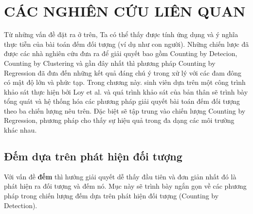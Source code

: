 \chapter{CÁC NGHIÊN CỨU LIÊN QUAN}
\ifpdf
    \graphicspath{{Chapter2/Chapter2Figs/PNG/}{Chapter2/Chapter2Figs/PDF/}{Chapter2/Chapter2Figs/}}
\else
    \graphicspath{{Chapter2/Chapter2Figs/EPS/}{Chapter2/Chapter2Figs/}}
\fi


Từ những vấn đề đặt ra ở trên, Ta có thể thấy được tính ứng dụng và ý nghĩa thực tiễn của bài toán đếm đối tượng (ví dụ như con người). Những chiến lược đã được các nhà nghiên cứu đưa ra để giải quyết bao gồm Counting by Detecion, Counting by Clustering và gần đây nhất thì phương pháp Counting by Regression đã đưa đến những kết quả đáng chú ý trong xử lý với các đam đông có mật độ lớn và phức tạp. Trong chương này. sinh viên dựa trên một công trình khảo sát thực hiện bởi Loy et al. \cite{loy2013crowd} và quá trình khảo sát của bản thân sẽ trình bày tổng quát và hệ thống hóa các phương pháp giải quyết bài toán đếm đối tượng theo ba chiến lượng nêu trên. Đặc biệt sẽ tập trung vào chiến lượng Counting by Regression, phương pháp cho thấy sự hiệu quả trong đa dạng các môi trường khác nhau.
\section{Đếm dựa trên phát hiện đối tượng}
Với vấn đề \textbf{đếm} thì hướng giải quyết dễ thấy đầu tiên và đơn giản nhất đó là phát hiện ra đối tượng và đếm nó. Mục này sẽ trình bày ngắn gọn về các phương pháp trong chiến lượng đếm dựa trên phát hiện đối tượng (Counting by Detection). \par

